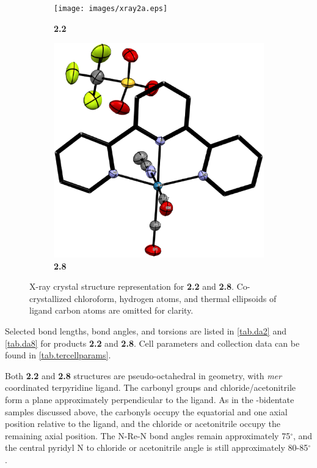 \begin{figure}[!htb]
 \centering
 \begin{subfigure}[b]{0.49\textwidth}
  \texttt{[image: images/xray2a.eps]}
  \caption{\textbf{2.2}}
  \label{fig.da2}
 \end{subfigure}
 \begin{subfigure}[b]{0.49\textwidth}
  \includegraphics[clip=true, width=\textwidth, keepaspectratio]{images/xray8a.eps}
  \caption{\textbf{2.8}}
  \label{fig.da8}
 \end{subfigure}
\caption[X-ray crystal structure representation for \textbf{2} and \textbf{8}.]{X-ray crystal structure representation for \textbf{2.2} and \textbf{2.8}. Co-crystallized chloroform, hydrogen atoms, and thermal ellipsoids of ligand carbon atoms are omitted for clarity.}
\label{fig.xrayter}
\end{figure} 

Selected bond lengths, bond angles, and torsions are listed in \autoref{tab.da2} and \autoref{tab.da8} for products \textbf{2.2} and \textbf{2.8}. Cell parameters and collection data can be found in \autoref{tab.tercellparams}. 

Both \textbf{2.2} and \textbf{2.8} structures are pseudo-octahedral in geometry, with \textit{mer} coordinated terpyridine ligand. The carbonyl groups and chloride/acetonitrile form a plane approximately perpendicular to the ligand. As in the -bidentate samples discussed above, the carbonyls occupy the equatorial and one axial position relative to the ligand, and the chloride or acetonitrile occupy the remaining axial position. The N-Re-N bond angles remain approximately 75$^\circ$, and the central pyridyl N to chloride or acetonitrile angle is still approximately 80-85$^\circ$. 

